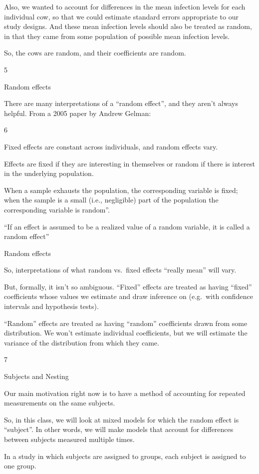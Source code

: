 \documentclass[
  letterpaper,
  DIV=11,
  numbers=noendperiod]{scrreprt}
\begin{document}
Also, we wanted to account for differences in the mean infection levels
for each individual cow, so that we could estimate standard errors
appropriate to our study designs. And these mean infection levels should
also be treated as random, in that they came from some population of
possible mean infection levels.

So, the cows are random, and their coefficients are random.

5

Random effects

There are many interpretations of a ``random effect'', and they aren't
always helpful. From a 2005 paper by Andrew Gelman:

6

Fixed effects are constant across individuals, and random effects vary.

Effects are fixed if they are interesting in themselves or random if
there is interest in the underlying population.

When a sample exhausts the population, the corresponding variable is
fixed; when the sample is a small (i.e., negligible) part of the
population the corresponding variable is random''.

``If an effect is assumed to be a realized value of a random variable,
it is called a random effect''

Random effects

So, interpretations of what random vs.~fixed effects ``really mean''
will vary.

But, formally, it isn't so ambiguous. ``Fixed'' effects are treated as
having ``fixed'' coefficients whose values we estimate and draw
inference on (e.g.~with confidence intervals and hypothesis tests).

``Random'' effects are treated as having ``random'' coefficients drawn
from some distribution. We won't estimate individual coefficients, but
we will estimate the variance of the distribution from which they came.

7

Subjects and Nesting

Our main motivation right now is to have a method of accounting for
repeated measurements on the same subjects.

So, in this class, we will look at mixed models for which the random
effect is ``subject''. In other words, we will make models that account
for differences between subjects measured multiple times.

In a study in which subjects are assigned to groups, each subject is
assigned to one group.
\end{document}

